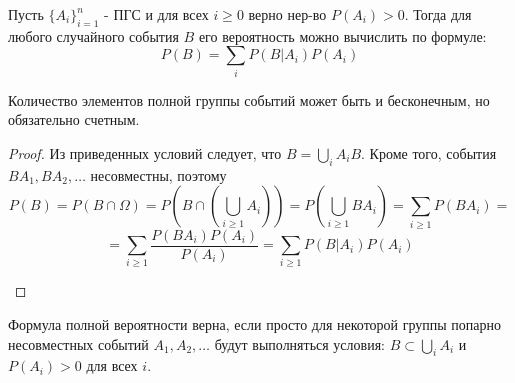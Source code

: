 \begin{definition}
	Пусть $\{A_i\}_{i=1}^{n}$ - ПГС и для всех $i \ge 0$ верно нер-во $P(A_i) > 0$. Тогда для любого случайного события $B$ его вероятность можно вычислить по формуле:
	\[ P(B) = \sum_{i} P(B|A_i) P(A_i) \]
\end{definition}
\begin{remark}
	Количество элементов полной группы событий может быть и бесконечным, но обязательно счетным.
\end{remark}
\begin{proof}
	Из приведенных условий следует, что $B = \bigcup\limits_{i}A_iB$. Кроме того, события $BA_1, BA_2, \dots$ несовместны, поэтому
	\[ P(B) = P(B \cap \Omega) = P \left( B \cap \left( \bigcup\limits_{i \ge 1} A_i \right) \right) = P \left( \bigcup\limits_{i \ge 1} BA_i \right) = \sum_{i \ge 1} P(BA_i) = \]
	\[ = \sum_{i \ge 1} \frac{P(BA_i) P(A_i)}{P(A_i)} = \sum_{i \ge 1} P(B|A_i) P(A_i) \]
	\begin{figure}[h]
	\end{figure}
\end{proof}
\begin{remark}
	Формула полной вероятности верна, если просто для некоторой группы попарно несовместных событий $A_1, A_2, \dots$ будут выполняться условия: $B \subset \bigcup\limits_{i} A_i$ и $P(A_i) > 0$ для всех $i$.
\end{remark}

